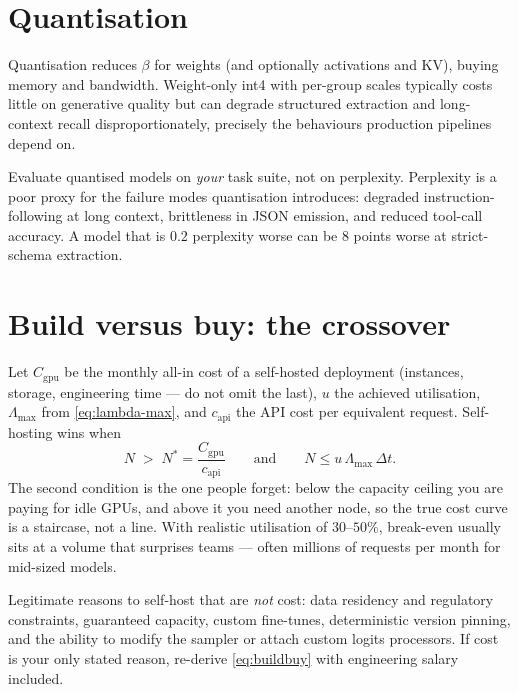 \documentclass[11pt,twoside,openright]{book}
\theoremstyle{definition}
\theoremstyle{plain}
\theoremstyle{remark}
\begin{document}
\section{Quantisation}

Quantisation reduces $\beta$ for weights (and optionally activations and KV),
buying memory and bandwidth. Weight-only int4 with per-group scales typically
costs little on generative quality but can degrade structured extraction and
long-context recall disproportionately, precisely the behaviours production
pipelines depend on.

\begin{caution}
Evaluate quantised models on \emph{your} task suite, not on perplexity.
Perplexity is a poor proxy for the failure modes quantisation introduces:
degraded instruction-following at long context, brittleness in JSON emission,
and reduced tool-call accuracy. A model that is $0.2$ perplexity worse can be
$8$ points worse at strict-schema extraction.
\end{caution}

\section{Build versus buy: the crossover}

Let $C_{\text{gpu}}$ be the monthly all-in cost of a self-hosted deployment
(instances, storage, engineering time --- do not omit the last), $u$ the achieved
utilisation, $\Lambda_{\max}$ from \eqref{eq:lambda-max}, and $c_{\text{api}}$
the API cost per equivalent request. Self-hosting wins when
\begin{equation}
  N \;>\; N^{*} = \frac{C_{\text{gpu}}}{c_{\text{api}}}
  \qquad\text{and}\qquad
  N \le u\,\Lambda_{\max}\, \Delta t .
\label{eq:buildbuy}
\end{equation}
The second condition is the one people forget: below the capacity ceiling you
are paying for idle GPUs, and above it you need another node, so the true cost
curve is a staircase, not a line. With realistic utilisation of $30$--$50\%$,
break-even usually sits at a volume that surprises teams --- often millions of
requests per month for mid-sized models.

\begin{practice}
Legitimate reasons to self-host that are \emph{not} cost: data residency and
regulatory constraints, guaranteed capacity, custom fine-tunes, deterministic
version pinning, and the ability to modify the sampler or attach custom logits
processors. If cost is your only stated reason, re-derive \eqref{eq:buildbuy}
with engineering salary included.
\end{practice}
\end{document}

